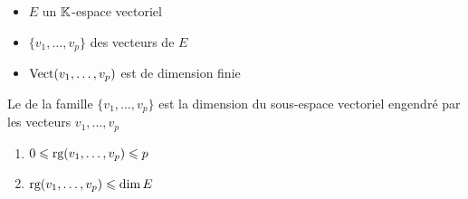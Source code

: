 \begin{frame}

\begin{itemize}
  \item $E$ un $\mathbb{K}$-espace vectoriel
  \pause
  \item $\{v_1, \ldots ,v_p\}$ des vecteurs de $E$
  \pause
  \item $\mathop{\text{Vect}}\nolimits(v_1, \ldots ,v_p)$ est de dimension finie
\end{itemize}

\pause

\begin{mydefinition}
Le  de la famille $\{v_1, \ldots ,v_p\}$ 
est la dimension du sous-espace vectoriel engendré par les vecteurs $v_1, \dots ,v_p$

\pause

\end{mydefinition}

\pause

\begin{proposition}
\begin{enumerate}
  \item $0 \leqslant \mathop{\text{rg}}\nolimits (v_1, \ldots ,v_p) \leqslant p$
\pause  
  \item $\mathop{\text{rg}}\nolimits (v_1, \ldots ,v_p) \leqslant \dim E$
\end{enumerate}
\end{proposition}

\end{frame}


